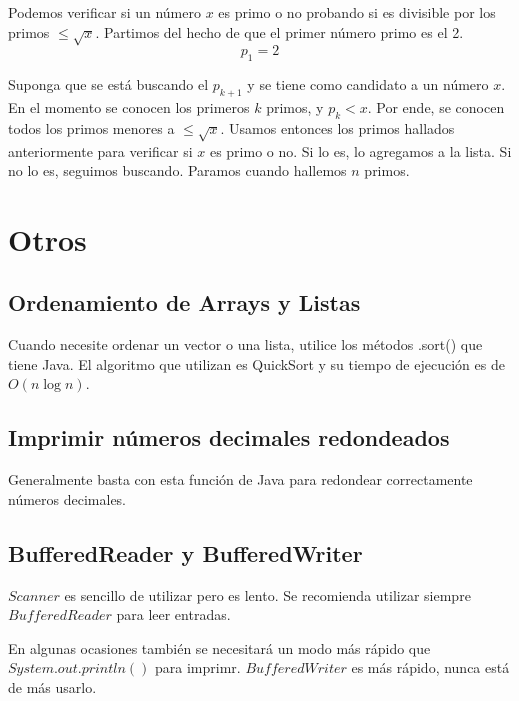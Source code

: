\documentclass{article}
\begin{document}
\begin{multicols}{2}
	Podemos verificar si un número \(x\) es primo o no probando si es divisible por los primos \( \leq \sqrt{x} \). Partimos del hecho de que el primer número primo es el 2.
	\[ p_{1} = 2 \]
	
	Suponga que se está buscando el \( p_{k+1} \) y se tiene como candidato a un número \( x \). En el momento se conocen los primeros \( k \) primos, y \( p_{k} < x \). Por ende, se conocen todos los primos menores a \( \leq \sqrt{x} \). Usamos entonces los primos hallados anteriormente para verificar si \( x \) es primo o no. Si lo es, lo agregamos a la lista. Si no lo es, seguimos buscando. Paramos cuando hallemos \( n \) primos.
	
		
\section{Otros}
	\subsection{Ordenamiento de Arrays y Listas}
	Cuando necesite ordenar un vector o una lista, utilice los métodos .sort() que tiene 		Java. El algoritmo que utilizan es QuickSort y su tiempo de ejecución es de \( O(n\log n) \).	
	
	\subsection{Imprimir números decimales redondeados}
	Generalmente basta con esta función de Java para redondear correctamente números decimales.	
	
	\subsection{BufferedReader y BufferedWriter}
	\(Scanner\) es sencillo de utilizar pero es lento. Se recomienda utilizar siempre \(BufferedReader\) para leer entradas.
	
	En algunas ocasiones también se necesitará un modo más rápido que \(System.out.println()\) para imprimr. \(BufferedWriter\) es más rápido, nunca está de más usarlo.
	
\end{multicols}	
\end{document}
